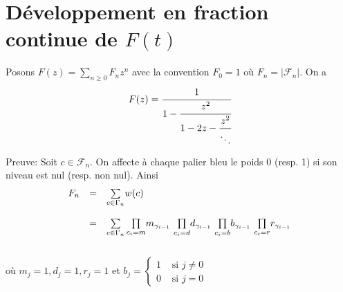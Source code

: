 \section{Développement en fraction continue de $F(t)$}
\begin{proposition} \label{Fn-frac} Posons $F(z) = \underset{n \geq 0}{\sum}F_{n}z^{n}$ avec la convention $F_{0}=1$ où $F_{n} = |\mathcal{F}_{n}|$.
	On a $$F(z) = \cfrac{1}{1 - \cfrac{z^2}{1 - 2z - \cfrac{z^2}{\ddots}}}$$\vspace{5pt}
\end{proposition}
Preuve:
Soit $c \in \mathcal{F}_n$.
On affecte à chaque palier bleu le poids 0 (resp. 1) si son niveau est nul (resp. non
nul).
Ainsi
\[
	\begin{array} {l l l}
		F_{n} & =       & \underset{c \in \Gamma_{n}}{\sum}w(c)                                                                    \\
		      & \text{} &                                                                                                          \\
		      & =       & \sum\limits_{c\in \Gamma_{n}}\underset{c_{i}=m}{\prod}m_{\gamma_{i-1}}\text{ } \underset{c_{i}=d}{\prod}
		d_{\gamma_{i-1}}\text{ }\underset{c_{i}=b}{\prod}b_{\gamma_{i-1}}\text{ }\underset{c_{i}=r}
		{\prod}r_{\gamma_{i-1}}                                                                                                    \\
	\end{array}
\]
\text{}\vspace{10pt}\\
où $m_{j}=1, d_{j}=1, r_{j}=1$ et $b_{j} = \begin{cases}
		1 & \text{ si } j\neq 0 \\
		0 & \text{ si } j=0
	\end{cases}$\\
